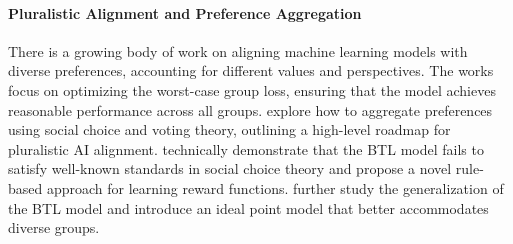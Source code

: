 \paragraph{Pluralistic Alignment and Preference Aggregation}
There is a growing body of work on aligning machine learning models with diverse preferences, accounting for different values and perspectives.  The works \citep{chakrabortymaxmin,ramesh2024group} focus on optimizing the worst-case group loss, ensuring that the model achieves reasonable performance across all groups. \citep{park2024rlhf, sorensenposition, conitzer2024social} explore how to aggregate preferences using social choice and voting theory, outlining a high-level roadmap for pluralistic AI alignment. \citep{ge2024axioms} technically demonstrate that the BTL model fails to satisfy well-known standards in social choice theory and propose a novel rule-based approach for learning reward functions. \citep{chen2024pal} further study the generalization of the BTL model and introduce an ideal point model that better accommodates diverse groups.


